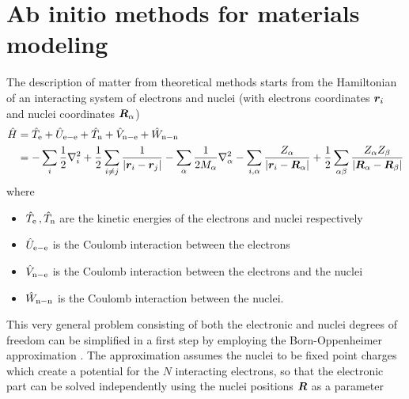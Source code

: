 \documentclass[main.tex]{subfiles}
\begin{document}
\chapter{Ab initio methods for materials modeling\label{chap:ab-initio-modeling}}


The description of matter from theoretical methods starts from the Hamiltonian of an interacting system of electrons and nuclei (with electrons coordinates \(\vb*{r}_i\) and nuclei coordinates \(\vb*{R}_{\alpha}\))
\begin{align}
    \hat{H} &= \hat{T}_{\mathrm{e}} + \hat{U}_{\mathrm{e-e}} + \hat{T}_{\mathrm{n}} + \hat{V}_{\mathrm{n-e}} + \hat{W}_{\mathrm{n-n}} \\
    &= - \sum_i \frac{1}{2} \nabla^2_i 
    + \frac{1}{2} \sum_{i \neq j} \frac{1}{\vert \vb*{r}_i - \vb*{r}_j \vert} 
    - \sum_{\alpha} \frac{1}{2 M_{\alpha}} \nabla^2_{\alpha}
    - \sum_{i, \alpha} \frac{Z_{\alpha}}{\vert \vb*{r}_i - \vb*{R}_{\alpha} \vert} 
    + \frac{1}{2} \sum_{\alpha \beta} \frac{Z_{\alpha} Z_{\beta}}{\vert \vb*{R}_{\alpha} - \vb*{R}_{\beta} \vert}
\end{align}
where
\begin{itemize}
    \item \(\hat{T}_{\mathrm{e}}\,, \hat{T}_{\mathrm{n}}\) are the kinetic energies of the electrons and nuclei respectively
    \item \(\hat{U}_{\mathrm{e-e}}\) is the Coulomb interaction between the electrons
    \item \(\hat{V}_{\mathrm{n-e}}\) is the Coulomb interaction between the electrons and the nuclei
    \item \(\hat{W}_{\mathrm{n-n}}\) is the Coulomb interaction between the nuclei.
\end{itemize}
This very general problem consisting of both the electronic and nuclei degrees of freedom can be simplified in a first step by employing the Born-Oppenheimer approximation \cite{born_zur_1927}.
The approximation assumes the nuclei to be fixed point charges which create a potential for the \(N\) interacting electrons, so that the electronic part can be solved independently using the nuclei positions \(\vb*{R}\) as a parameter
\end{document}
